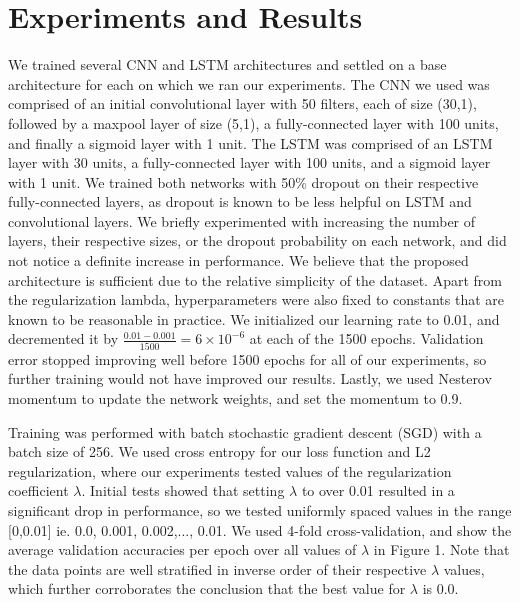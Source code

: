 \documentclass{article} %
\begin{document}
\section{Experiments and Results}
We trained several CNN and LSTM architectures and settled on a base architecture for each on which we ran our experiments. The CNN we used was comprised of an initial convolutional layer with 50 filters, each of size (30,1), followed by a maxpool layer of size (5,1), a fully-connected layer with 100 units, and finally a sigmoid layer with 1 unit. The LSTM was comprised of an LSTM layer with 30 units, a fully-connected layer with 100 units, and a sigmoid layer with 1 unit. We trained both networks with 50\% dropout on their respective fully-connected layers, as dropout is known to be less helpful on LSTM and convolutional layers. We briefly experimented with increasing the number of layers, their respective sizes, or the dropout probability on each network, and did not notice a definite increase in performance. We believe that the proposed architecture is sufficient due to the relative simplicity of the dataset. Apart from the regularization lambda, hyperparameters were also fixed to constants that are known to be reasonable in practice. We initialized our learning rate to 0.01, and decremented it by $\frac{0.01-0.001}{1500} = 6 \times 10^{-6}$ at each of the 1500 epochs. Validation error stopped improving well before 1500 epochs for all of our experiments, so further training would not have improved our results. Lastly, we used Nesterov momentum \cite{Sutskever} to update the network weights, and set the momentum to 0.9.

Training was performed with batch stochastic gradient descent (SGD) with a batch size of 256. We used cross entropy for our loss function and L2 regularization, where our experiments tested values of the regularization coefficient $\lambda$. Initial tests showed that setting $\lambda$ to over 0.01 resulted in a significant drop in performance, so we tested uniformly spaced values in the range [0,0.01] ie. 0.0, 0.001, 0.002,..., 0.01. We used 4-fold cross-validation, and show the average validation accuracies per epoch over all values of $\lambda$ in Figure 1. Note that the data points are well stratified in inverse order of their respective $\lambda$ values, which further corroborates the conclusion that the best value for $\lambda$ is 0.0.
\end{document}
